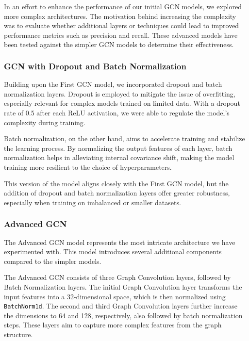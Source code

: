 In an effort to enhance the performance of our initial GCN models, we explored more complex architectures. The motivation behind increasing the complexity was to evaluate whether additional layers or techniques could lead to improved performance metrics such as precision and recall. These advanced models have been tested against the simpler GCN models to determine their effectiveness.

\subsubsection{GCN with Dropout and Batch Normalization}

Building upon the First GCN model, we incorporated dropout and batch normalization layers. Dropout is employed to mitigate the issue of overfitting, especially relevant for complex models trained on limited data. With a dropout rate of 0.5 after each ReLU activation, we were able to regulate the model's complexity during training. 

Batch normalization, on the other hand, aims to accelerate training and stabilize the learning process. By normalizing the output features of each layer, batch normalization helps in alleviating internal covariance shift, making the model training more resilient to the choice of hyperparameters.

This version of the model aligns closely with the First GCN model, but the addition of dropout and batch normalization layers offer greater robustness, especially when training on imbalanced or smaller datasets.

\subsubsection{Advanced GCN}

The Advanced GCN model represents the most intricate architecture we have experimented with. This model introduces several additional components compared to the simpler models.

The Advanced GCN consists of three Graph Convolution layers, followed by Batch Normalization layers. The initial Graph Convolution layer transforms the input features into a 32-dimensional space, which is then normalized using \texttt{BatchNorm1d}. The second and third Graph Convolution layers further increase the dimensions to 64 and 128, respectively, also followed by batch normalization steps. These layers aim to capture more complex features from the graph structure.

